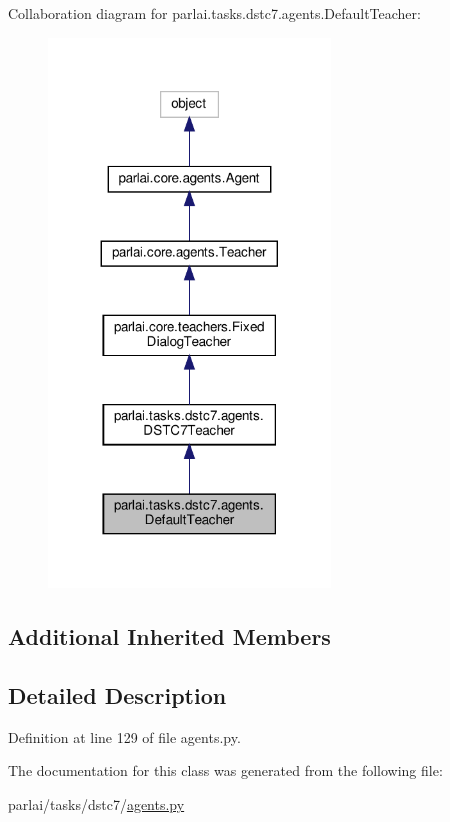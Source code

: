 Collaboration diagram for parlai.\+tasks.\+dstc7.\+agents.\+Default\+Teacher\+:
\nopagebreak
\begin{figure}[H]
\begin{center}
\leavevmode
\includegraphics[width=212pt]{df/d4f/classparlai_1_1tasks_1_1dstc7_1_1agents_1_1DefaultTeacher__coll__graph}
\end{center}
\end{figure}
\subsection*{Additional Inherited Members}


\subsection{Detailed Description}


Definition at line 129 of file agents.\+py.



The documentation for this class was generated from the following file\+:\begin{DoxyCompactItemize}
\item 
parlai/tasks/dstc7/\hyperlink{parlai_2tasks_2dstc7_2agents_8py}{agents.\+py}\end{DoxyCompactItemize}
